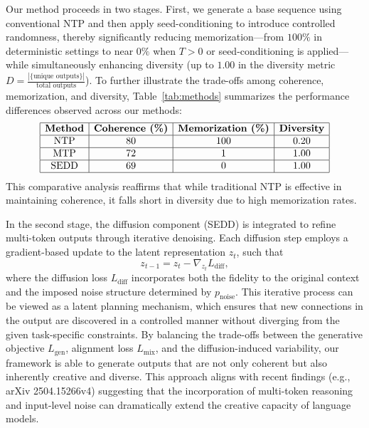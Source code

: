 \documentclass[11pt]{article}
\begin{document}
Our method proceeds in two stages. First, we generate a base sequence using conventional NTP and then apply seed-conditioning to introduce controlled randomness, thereby significantly reducing memorization—from \(100\%\) in deterministic settings to near \(0\%\) when \(T>0\) or seed-conditioning is applied—while simultaneously enhancing diversity (up to \(1.00\) in the diversity metric \( D = \frac{|\{ \text{unique outputs} \}|}{\text{total outputs}} \)). To further illustrate the trade-offs among coherence, memorization, and diversity, Table~\ref{tab:methods} summarizes the performance differences observed across our methods:
\[
\begin{array}{|c|c|c|c|}
\hline
\textbf{Method} & \textbf{Coherence (\%)} & \textbf{Memorization (\%)} & \textbf{Diversity} \\
\hline
\text{NTP}  & 80  & 100 & 0.20 \\
\hline
\text{MTP}  & 72  & 1   & 1.00 \\
\hline
\text{SEDD} & 69  & 0   & 1.00 \\
\hline
\end{array}
\]
This comparative analysis reaffirms that while traditional NTP is effective in maintaining coherence, it falls short in diversity due to high memorization rates.

In the second stage, the diffusion component (SEDD) is integrated to refine multi-token outputs through iterative denoising. Each diffusion step employs a gradient-based update to the latent representation \( z_t \), such that
\[
z_{t-1} = z_t - \nabla_{z_t} L_{\text{diff}},
\]
where the diffusion loss \( L_{\text{diff}} \) incorporates both the fidelity to the original context and the imposed noise structure determined by \( p_{\text{noise}} \). This iterative process can be viewed as a latent planning mechanism, which ensures that new connections in the output are discovered in a controlled manner without diverging from the given task-specific constraints. By balancing the trade-offs between the generative objective \( L_{\text{gen}} \), alignment loss \( L_{\text{mix}} \), and the diffusion-induced variability, our framework is able to generate outputs that are not only coherent but also inherently creative and diverse. This approach aligns with recent findings (e.g., arXiv 2504.15266v4) suggesting that the incorporation of multi-token reasoning and input-level noise can dramatically extend the creative capacity of language models.
\end{document}
